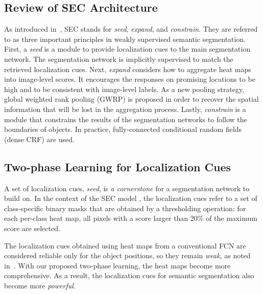 \documentclass[10pt,twocolumn,letterpaper]{article}
\begin{document}
\subsection{Review of SEC Architecture}
\label{sec:SEC}

As introduced in~\cite{kolesnikov2016seed}, SEC stands for \textit{seed}, \textit{expand}, and \textit{constrain}. They are referred to as three important principles in weakly supervised semantic segmentation. First, a \textit{seed} is a module to provide localization cues to the main segmentation network. The segmentation network is implicitly supervised to match the retrieved localization cues. %
Next, \textit{expand} considers how to aggregate heat maps into image-level scores. It encourages the responses on promising locations to be high and to be consistent with image-level labels. As a new pooling strategy, global weighted rank pooling (GWRP) is proposed in order to recover the spatial information that will be lost in the aggregation process. Lastly, \textit{constrain} is a module that constrains the results of the segmentation networks to follow the boundaries of objects. In practice, fully-connected conditional random fields (dense CRF) \cite{ToyodaH08crf} are used.

\subsection{Two-phase Learning for Localization Cues}
A set of localization cues, \textit{seed}, is \textit{a cornerstone} for a segmentation network to build on. In the context of the SEC model \cite{kolesnikov2016seed}, the localization cues refer to a set of class-specific binary masks that are obtained by a thresholding operation: for each per-class heat map, all pixels with a score larger than 20\% of the maximum score are selected.

The localization cues obtained using heat maps from a conventional FCN are considered reliable only for the object positions, so they remain \textit{weak}, as noted in~\cite{Pinheiro2015CVPR,Bilen16,kolesnikov2016seed}. With our proposed two-phase learning, the heat maps become more comprehensive. As a result, the localization cues for semantic segmentation also become more \textit{powerful}.
\end{document}
